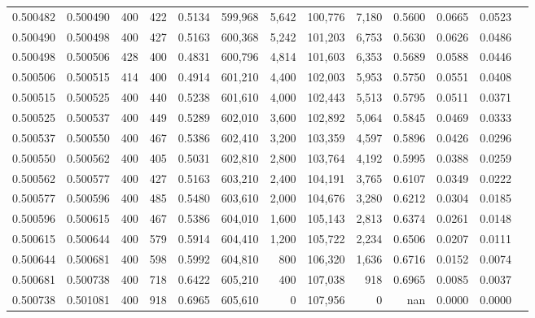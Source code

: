 \begin{tabular}{rrrrrrrrrrrrr}
0.500482 & 0.500490 &    400 & 422 &                                     0.5134 & 599,968 &   5,642 & 100,776 &   7,180 & 0.5600 & 0.0665 & 0.0523 \\
0.500490 & 0.500498 &    400 & 427 &                                     0.5163 & 600,368 &   5,242 & 101,203 &   6,753 & 0.5630 & 0.0626 & 0.0486 \\
0.500498 & 0.500506 &    428 & 400 &                                     0.4831 & 600,796 &   4,814 & 101,603 &   6,353 & 0.5689 & 0.0588 & 0.0446 \\
0.500506 & 0.500515 &    414 & 400 &                                     0.4914 & 601,210 &   4,400 & 102,003 &   5,953 & 0.5750 & 0.0551 & 0.0408 \\
0.500515 & 0.500525 &    400 & 440 &                                     0.5238 & 601,610 &   4,000 & 102,443 &   5,513 & 0.5795 & 0.0511 & 0.0371 \\
0.500525 & 0.500537 &    400 & 449 &                                     0.5289 & 602,010 &   3,600 & 102,892 &   5,064 & 0.5845 & 0.0469 & 0.0333 \\
0.500537 & 0.500550 &    400 & 467 &                                     0.5386 & 602,410 &   3,200 & 103,359 &   4,597 & 0.5896 & 0.0426 & 0.0296 \\
0.500550 & 0.500562 &    400 & 405 &                                     0.5031 & 602,810 &   2,800 & 103,764 &   4,192 & 0.5995 & 0.0388 & 0.0259 \\
0.500562 & 0.500577 &    400 & 427 &                                     0.5163 & 603,210 &   2,400 & 104,191 &   3,765 & 0.6107 & 0.0349 & 0.0222 \\
0.500577 & 0.500596 &    400 & 485 &                                     0.5480 & 603,610 &   2,000 & 104,676 &   3,280 & 0.6212 & 0.0304 & 0.0185 \\
0.500596 & 0.500615 &    400 & 467 &                                     0.5386 & 604,010 &   1,600 & 105,143 &   2,813 & 0.6374 & 0.0261 & 0.0148 \\
0.500615 & 0.500644 &    400 & 579 &                                     0.5914 & 604,410 &   1,200 & 105,722 &   2,234 & 0.6506 & 0.0207 & 0.0111 \\
0.500644 & 0.500681 &    400 & 598 &                                     0.5992 & 604,810 &     800 & 106,320 &   1,636 & 0.6716 & 0.0152 & 0.0074 \\
0.500681 & 0.500738 &    400 & 718 &                                     0.6422 & 605,210 &     400 & 107,038 &     918 & 0.6965 & 0.0085 & 0.0037 \\
0.500738 & 0.501081 &    400 & 918 &                                     0.6965 & 605,610 &       0 & 107,956 &       0 &    nan & 0.0000 & 0.0000 \\
\bottomrule
\end{tabular}
